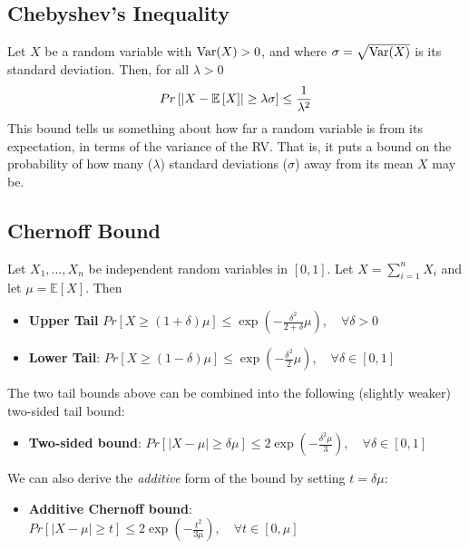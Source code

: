 \documentclass[10pt,a4paper]{article}
\begin{document}
\subsection*{Chebyshev's Inequality}

Let $X$ be a random variable with $\text{Var}(X) > 0$, and where $\sigma = \sqrt{\text{Var}(X)}$ is its standard deviation. Then, for all $\lambda > 0$
\begin{align*}
    Pr \left[ \left| X - \mathbb{E}\left[X\right] \right| \geq \lambda \sigma \right] \leq \dfrac{1}{\lambda^2}
\end{align*}
This bound tells us something about how far a random variable is from its expectation, in terms of the variance of the RV. That is, it puts a bound on the probability of how many ($\lambda$) standard deviations ($\sigma$) away from its mean $X$ may be.


\subsection*{Chernoff Bound}

Let $X_1,\dots,X_n$ be independent random variables in $[0,1]$. Let $X = \sum_{i=1}^n X_i$ and let $\mu = \mathbb{E}[X]$. Then
\begin{itemize}
    \item \textbf{Upper Tail}
    $Pr[X \geq (1+\delta)\mu] \leq \exp\left({-\tfrac{\delta^2}{2+\delta}\mu}\right), \quad  \forall \delta > 0$
    \item \textbf{Lower Tail}:
    $Pr[X \geq (1-\delta)\mu] \leq \exp\left({-\tfrac{\delta^2}{2}\mu}\right), \quad  \forall \delta \in [0,1]$
\end{itemize}
The two tail bounds above can be combined into the following (slightly weaker) two-sided tail bound:
\begin{itemize}
    \item \textbf{Two-sided bound}: $Pr[|X-\mu| \geq \delta \mu] \leq 2 \exp\left({-\tfrac{\delta^2 \mu}{3}}\right), \quad  \forall \delta \in [0,1]$
\end{itemize}
We can also derive the \textit{additive} form of the bound by setting $t=\delta \mu$:
\begin{itemize}
    \item \textbf{Additive Chernoff bound}: 
    $Pr[|X-\mu| \geq t] \leq 2 \exp \left( {-\tfrac{t^2}{3 \mu}} \right), \quad  \forall t \in [0,\mu]$
\end{itemize}
\end{document}
